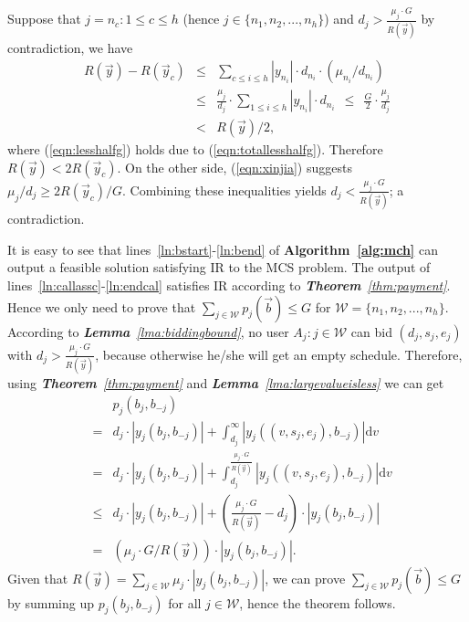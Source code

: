 \documentclass[10pt,journal,compsoc]{IEEEtran}
\begin{document}
\begin{IEEEproof} 
Suppose that $j=n_c\!:1\leq c\leq h$ (hence $j\in \{n_1,n_2,...,n_h\}$) and $d_{j}> \frac{\mu_{j}\cdot G}{R(\vec{y})}$ by contradiction, we have
\begin{eqnarray}
\!\!\!\!\!\!\!R(\vec{y})-R(\vec{y}_c) &\leq& \sum\nolimits_{c\leq i\leq h}|y_{n_i}|\cdot d_{n_i}\cdot ({\mu_{n_i}}/{d_{n_i}}) \nonumber\\
    &\leq& \frac{\mu_j}{d_j}\cdot \sum_{1\leq i\leq h}|y_{n_i}|\cdot d_{n_i}~~\leq~~\frac{G}{2}\cdot \frac{\mu_j}{d_j} \label{eqn:lesshalfg}\\
    &<& {R(\vec{y})}/{2},\nonumber
  \end{eqnarray}
where (\ref{eqn:lesshalfg}) holds due to (\ref{eqn:totallesshalfg}). Therefore $R(\vec{y})< 2R(\vec{y}_c)$. On the other side, (\ref{eqn:xinjia}) suggests ${\mu_{j}}/{d_{j}}\geq {2R(\vec{y}_c)}/{G}$. Combining these inequalities yields $d_{j}<\frac{\mu_{j}\cdot G}{R(\vec{y})}$; a contradiction. \end{IEEEproof}

\begin{IEEEproof}
It is easy to see that lines~\ref{ln:bstart}-\ref{ln:bend} of \textbf{Algorithm~\ref{alg:mch}} can output a feasible solution satisfying IR to the MCS problem. The output of lines~\ref{ln:callassc}-\ref{ln:endcal} satisfies IR according to \textit{\textbf{Theorem}~\ref{thm:payment}}. Hence we only need to prove that $\sum_{j\in \mathcal{W}} p_{j}(\vec{b})\leq G$ for $\mathcal{W}=\{n_1,n_2,...,n_h\}$. According to \textit{\textbf{Lemma}~\ref{lma:biddingbound}}, no user $A_j\!: j\in \mathcal{W}$ can bid $(d_j,s_j,e_j)$ with $d_{j}>\frac{\mu_{j}\cdot G}{R(\vec{y})}$, because otherwise he/she will get an empty schedule. Therefore, using \textit{\textbf{Theorem}~\ref{thm:payment}} and \textit{\textbf{Lemma}~\ref{lma:largevalueisless}} we can get
\begin{eqnarray}
    && p_j(b_j,b_{-j}) \nonumber\\
    &=& d_j\cdot |y_j(b_j,b_{-j})| + \int_{d_j}^{\infty} |y_j\left((v,s_j,e_j),b_{-j}\right)|\mathrm{d}v \nonumber\\
    &=& d_j\cdot |y_j(b_j,b_{-j})| + \int_{d_j}^{\frac{\mu_{j}\cdot G}{R(\vec{y})}} |y_j\left((v,s_j,e_j),b_{-j}\right)|\mathrm{d}v \nonumber\\
    &\leq& d_j\cdot |y_j(b_j, b_{-j})| + \left(\frac{\mu_{j}\cdot G}{R(\vec{y})}-d_j\right)\cdot |y_j(b_j,b_{-j})|\nonumber\\
    &=& \left({\mu_{j}\cdot G}/{R(\vec{y})}\right)\cdot |y_j(b_j,b_{-j})|. \nonumber
  \end{eqnarray}
Given that $R(\vec{y})=\sum_{j\in \mathcal{W}}\mu_j\cdot |y_j(b_j,b_{-j})|$, we can prove $\sum_{j\in \mathcal{W}} p_{j}(\vec{b})\leq G$ by summing up $p_j(b_j,b_{-j})$ for all $j\in \mathcal{W}$, hence the theorem follows.
\end{IEEEproof}
\end{document}
